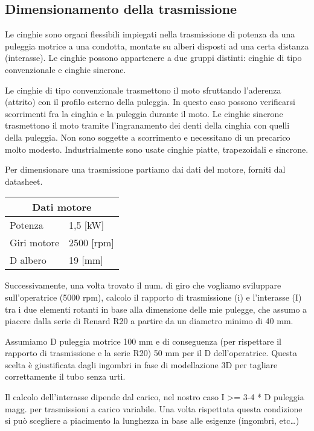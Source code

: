 \documentclass{report}
\begin{document}
\subsection{Dimensionamento della trasmissione}
Le cinghie sono organi flessibili impiegati nella trasmissione di potenza da una puleggia motrice a una condotta, montate su alberi disposti ad una certa distanza (interasse). Le cinghie possono appartenere a due gruppi distinti: cinghie di tipo convenzionale e cinghie sincrone.

Le cinghie di tipo convenzionale trasmettono il moto sfruttando l’aderenza (attrito) con il profilo esterno della puleggia. In questo caso possono verificarsi scorrimenti fra la cinghia e la puleggia durante il moto.
Le cinghie sincrone trasmettono il moto tramite l’ingranamento dei denti della cinghia con quelli della puleggia. Non sono soggette a scorrimento e necessitano di un precarico molto modesto.
Industrialmente sono usate cinghie piatte, trapezoidali e sincrone.

Per dimensionare una trasmissione partiamo dai dati del motore, forniti dal datasheet.

\begin{table}[H]
\centering
\begin{tabular}{|l|l|}
\hline
\multicolumn{2}{|c|}{\textbf{Dati motore}} \\ \hline
Potenza & 1,5 {[}kW{]} \\ \hline
Giri motore & 2500 {[}rpm{]} \\ \hline
D albero & 19 {[}mm{]} \\ \hline
\end{tabular}
\end{table}

Successivamente, una volta trovato il num. di giro che vogliamo sviluppare sull’operatrice (5000 rpm), calcolo il rapporto di trasmissione (i) e l’interasse (I) tra i due elementi rotanti in base alla dimensione delle mie pulegge, che assumo a piacere dalla serie di Renard R20 a partire da un diametro minimo di 40 mm.

Assumiamo D puleggia motrice 100 mm e di conseguenza (per rispettare il rapporto di trasmissione e la serie R20) 50 mm per il D dell’operatrice. Questa scelta è giustificata dagli ingombri in fase di modellazione 3D per tagliare correttamente il tubo senza urti.

Il calcolo dell’interasse dipende dal carico, nel nostro caso I >= 3-4 * D puleggia magg. per trasmissioni a carico variabile. Una volta rispettata questa condizione si può scegliere a piacimento la lunghezza in base alle esigenze (ingombri, etc…)
\end{document}
